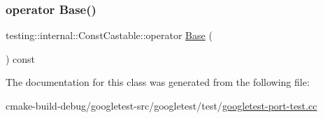 \subsubsection{\texorpdfstring{operator Base()}{operator Base()}}
{\footnotesize\ttfamily testing\+::internal\+::\+Const\+Castable\+::operator \mbox{\hyperlink{classBase}{Base}} (\begin{DoxyParamCaption}{ }\end{DoxyParamCaption}) const\hspace{0.3cm}{\ttfamily [inline]}}



The documentation for this class was generated from the following file\+:\begin{DoxyCompactItemize}
\item 
cmake-\/build-\/debug/googletest-\/src/googletest/test/\mbox{\hyperlink{googletest-port-test_8cc}{googletest-\/port-\/test.\+cc}}\end{DoxyCompactItemize}

